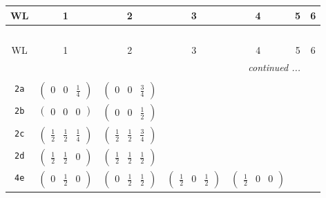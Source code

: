 \documentclass[fleqn,9pt,landscape]{jsarticle}
\begin{document}
\begin{center}
\renewcommand{\arraystretch}{1.2}
\begin{longtable}{ccccccc}
 \hline \hline
WL & 1 & 2 & 3 & 4 & 5 & 6 \\ \hline \endfirsthead

\multicolumn{6}{l}{\tablename\ \thetable{}} \\
 \hline \hline
WL & 1 & 2 & 3 & 4 & 5 & 6 \\ \hline \endhead

 \hline \hline
\multicolumn{6}{r}{\footnotesize\it continued ...} \\ \endfoot

 \hline \hline
\multicolumn{6}{r}{} \\ \endlastfoot

{\tt 2a} & $ \begin{pmatrix} 0 & 0 & \frac{1}{4} \end{pmatrix} $ & $ \begin{pmatrix} 0 & 0 & \frac{3}{4} \end{pmatrix} $ & $  $ & $  $ & $  $ & $  $ \\ \hline
{\tt 2b} & $ \begin{pmatrix} 0 & 0 & 0 \end{pmatrix} $ & $ \begin{pmatrix} 0 & 0 & \frac{1}{2} \end{pmatrix} $ & $  $ & $  $ & $  $ & $  $ \\ \hline
{\tt 2c} & $ \begin{pmatrix} \frac{1}{2} & \frac{1}{2} & \frac{1}{4} \end{pmatrix} $ & $ \begin{pmatrix} \frac{1}{2} & \frac{1}{2} & \frac{3}{4} \end{pmatrix} $ & $  $ & $  $ & $  $ & $  $ \\ \hline
{\tt 2d} & $ \begin{pmatrix} \frac{1}{2} & \frac{1}{2} & 0 \end{pmatrix} $ & $ \begin{pmatrix} \frac{1}{2} & \frac{1}{2} & \frac{1}{2} \end{pmatrix} $ & $  $ & $  $ & $  $ & $  $ \\ \hline
{\tt 4e} & $ \begin{pmatrix} 0 & \frac{1}{2} & 0 \end{pmatrix} $ & $ \begin{pmatrix} 0 & \frac{1}{2} & \frac{1}{2} \end{pmatrix} $ & $ \begin{pmatrix} \frac{1}{2} & 0 & \frac{1}{2} \end{pmatrix} $ & $ \begin{pmatrix} \frac{1}{2} & 0 & 0 \end{pmatrix} $ & $  $ & $  $ \\ \hline

\end{longtable}
\end{center}
\end{document}
